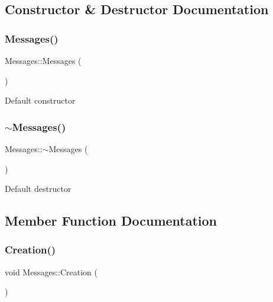 \subsection{Constructor \& Destructor Documentation}
\mbox{\label{classMessages_abd3013dea54bfd87550739c3fa6e20d5}} 
\subsubsection{\texorpdfstring{Messages()}{Messages()}}
{\footnotesize\ttfamily Messages\+::\+Messages (\begin{DoxyParamCaption}{ }\end{DoxyParamCaption})}

Default constructor \mbox{\label{classMessages_ab0060ed5667e5dd2d47811df6c42d462}} 
\subsubsection{\texorpdfstring{$\sim$\+Messages()}{~Messages()}}
{\footnotesize\ttfamily Messages\+::$\sim$\+Messages (\begin{DoxyParamCaption}{ }\end{DoxyParamCaption})\hspace{0.3cm}{\ttfamily [virtual]}}

Default destructor 

\subsection{Member Function Documentation}
\mbox{\label{classMessages_ac575287a8c19833d30480c5fb1769dfa}} 
\subsubsection{\texorpdfstring{Creation()}{Creation()}}
{\footnotesize\ttfamily void Messages\+::\+Creation (\begin{DoxyParamCaption}{ }\end{DoxyParamCaption})\hspace{0.3cm}{\ttfamily [inline]}}

